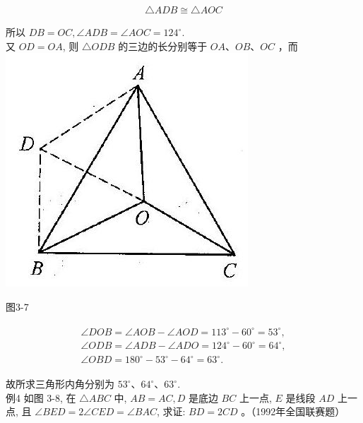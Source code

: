 \documentclass[10pt]{article}
\begin{document}
\begin{align*}
\triangle A D B \cong \triangle A O C
\end{align*}

所以 $D B=O C, \angle A D B=\angle A O C=124^{\circ}$.\\
又 $O D=O A$, 则 $\triangle O D B$ 的三边的长分别等于 $O A 、 O B 、 O C$ ，而\\
\includegraphics[max width=\textwidth, center]{2024_10_30_2c8f45efd4a519b08e1ag-027}

图3-7

\begin{align*}
\begin{gathered}
\angle D O B=\angle A O B-\angle A O D=113^{\circ}-60^{\circ}=53^{\circ}, \\
\angle O D B=\angle A D B-\angle A D O=124^{\circ}-60^{\circ}=64^{\circ}, \\
\angle O B D=180^{\circ}-53^{\circ}-64^{\circ}=63^{\circ} .
\end{gathered}
\end{align*}

故所求三角形内角分别为 $53^{\circ} 、 64^{\circ} 、 63^{\circ}$.\\
例4 如图 3-8, 在 $\triangle A B C$ 中, $A B=A C, D$ 是底边 $B C$ 上一点, $E$ 是线段 $A D$ 上一点, 且 $\angle B E D=2 \angle C E D=\angle B A C$, 求证: $B D=2 C D$ 。（1992年全国联赛题）
\end{document}
